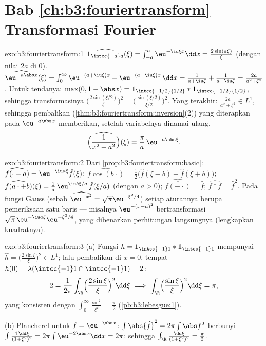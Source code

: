 \section*{Bab \ref{ch:b3:fouriertransform} --- Transformasi
Fourier}

\begin{solution}{exo:b3:fouriertransform:1}
$\widehat{\mathbf 1_{\intcc{-a}a}}(\xi) =
\int_{-a}^a\eu^{-\iu\xi x}\dd x = \frac{2\sin(a\xi)}{\xi}$
(dengan nilai $2a$ di $0$).
$\widehat{\eu^{-a\abs x}}(\xi) = \int_0^\infty\eu^{-(a +
\iu\xi)x} + \eu^{-(a - \iu\xi)x}\,\dd x = \frac1{a + \iu\xi} +
\frac1{a - \iu\xi} = \frac{2a}{a^2 + \xi^2}$.
Untuk tendanya: $\max(0, 1 - \abs x) = \mathbf 1_{\intcc{-1/2}{1/2}} *
\mathbf 1_{\intcc{-1/2}{1/2}}$, sehingga transformasinya
$\bigl(\frac{2\sin(\xi/2)}\xi\bigr)^2 =
\bigl(\frac{\sin(\xi/2)}{\xi/2}\bigr)^2$.
Yang terakhir: $\frac{2a}{a^2+\xi^2} \in L^1$, sehingga pembalikan
(\cref{thm:b3:fouriertransform:inversion}(2)) yang diterapkan pada
$\eu^{-a\abs x}$ memberikan, setelah variabelnya dinamai ulang,
\[
\widehat{\Bigl(\frac1{x^2 + a^2}\Bigr)}(\xi) =
\frac{\pi}{a}\,\eu^{-a\abs\xi} .
\]
\end{solution}

\begin{solution}{exo:b3:fouriertransform:2}
Dari \cref{prop:b3:fouriertransform:basic}:
$\widehat{f(\cdot - a)} = \eu^{-\iu a\xi}\hat f(\xi)$;
$\widehat{f\cos(b\cdot)} = \frac12\bigl(\hat f(\xi - b) + \hat
f(\xi + b)\bigr)$;
$\widehat{f(a\cdot + b)}(\xi) = \frac1a\,\eu^{\iu
b\xi/a}\,\hat f(\xi/a)$ (dengan $a > 0$);
$\widehat{\overline{f(-\cdot)}} = \overline{\hat f}$;
$\widehat{f * f} = \hat f^2$. Pada fungsi Gauss
(sebab $\widehat{\eu^{-x^2}} = \sqrt\pi\eu^{-\xi^2/4}$) setiap aturannya berupa
pemeriksaan satu baris --- misalnya $\eu^{-(x-a)^2}$ bertransformasi
$\sqrt\pi\,\eu^{-\iu a\xi}\eu^{-\xi^2/4}$, yang dibenarkan
perhitungan langsungnya (lengkapkan kuadratnya).
\end{solution}

\begin{solution}{exo:b3:fouriertransform:3}
(a) Fungsi $h = \mathbf 1_{\intcc{-1}1}*\mathbf 1_{\intcc{-1}1}$ mempunyai
$\hat h = \bigl(\frac{2\sin\xi}\xi\bigr)^2 \in L^1$; lalu pembalikan
di $x = 0$, tempat $h(0) = \lambda(\intcc{-1}1\cap\intcc{-1}1)
= 2$:
\[
2 = \frac1{2\pi}\int_\R\Bigl(\frac{2\sin\xi}\xi\Bigr)^2
\dd\xi
\ \Longrightarrow\
\int_\R\Bigl(\frac{\sin\xi}\xi\Bigr)^2\dd\xi = \pi ,
\]
yang konsisten dengan $\int_0^\infty\frac{\sin^2}{\xi^2} =
\frac\pi2$ (\cref{pb:b3:lebesgue:1}).

(b) Plancherel untuk $f = \eu^{-\abs x}$: $\int\abs{\hat f}^2 =
2\pi\int\abs f^2$ berbunyi $\int\frac{4\,\dd\xi}{(1 + \xi^2)^2} =
2\pi\int\eu^{-2\abs x}\dd x = 2\pi$: sehingga
$\int_\R\frac{\dd\xi}{(1+\xi^2)^2} = \frac\pi2$.
\end{solution}

